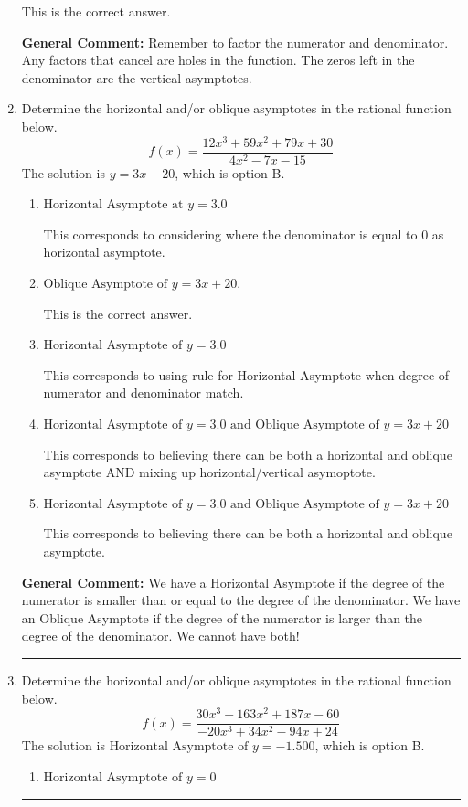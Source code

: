 \documentclass{extbook}[14pt]
\newcommand{\litem}[1]{\item #1

\rule{\textwidth}{0.4pt}}
\begin{document}
\begin{enumerate}
{\begin{enumerate}[label=\Alph*.]
This is the correct answer.
\end{enumerate}

\textbf{General Comment:} Remember to factor the numerator and denominator. Any factors that cancel are holes in the function. The zeros left in the denominator are the vertical asymptotes.
}
\litem{
Determine the horizontal and/or oblique asymptotes in the rational function below.
\[ f(x) = \frac{12x^{3} +59 x^{2} +79 x + 30}{4x^{2} -7 x -15} \]The solution is \( y = 3x + 20 \), which is option B.\begin{enumerate}[label=\Alph*.]
\item \( \text{Horizontal Asymptote at } y = 3.0 \)

This corresponds to considering where the denominator is equal to 0 as horizontal asymptote.
\item \( \text{Oblique Asymptote of } y = 3x + 20. \)

This is the correct answer.
\item \( \text{Horizontal Asymptote of } y = 3.0  \)

This corresponds to using rule for Horizontal Asymptote when degree of numerator and denominator match.
\item \( \text{Horizontal Asymptote of } y = 3.0 \text{ and Oblique Asymptote of } y = 3x + 20 \)

This corresponds to believing there can be both a horizontal and oblique asymptote AND mixing up horizontal/vertical asymoptote.
\item \( \text{Horizontal Asymptote of } y = 3.0 \text{ and Oblique Asymptote of } y = 3x + 20 \)

This corresponds to believing there can be both a horizontal and oblique asymptote.
\end{enumerate}

\textbf{General Comment:} We have a Horizontal Asymptote if the degree of the numerator is smaller than or equal to the degree of the denominator. We have an Oblique Asymptote if the degree of the numerator is larger than the degree of the denominator. We cannot have both!
}
\litem{
Determine the horizontal and/or oblique asymptotes in the rational function below.
\[ f(x) = \frac{30x^{3} -163 x^{2} +187 x -60}{-20x^{3} +34 x^{2} -94 x + 24} \]The solution is \( \text{Horizontal Asymptote of } y = -1.500  \), which is option B.\begin{enumerate}[label=\Alph*.]
\item \( \text{Horizontal Asymptote of } y = 0  \)


\end{enumerate}}
\end{enumerate}
\end{document}
